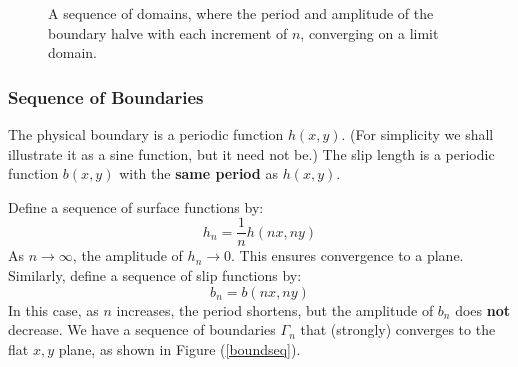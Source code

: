 \documentclass[12pt, a4paper, twoside, openright]{book}
\newcommand{\beff}{\ensuremath{b_{\mathrm{eff}}}}
\begin{document}
\clearpage
\begin{figure}[ht]
\centering
{}
\caption{A sequence of domains, where the period and amplitude of the boundary halve with each increment of $n$, converging on a limit domain.}\label{domainseq}
\end{figure}



\subsubsection{Sequence of Boundaries}

The physical boundary is a periodic function $h(x,y)$.  (For simplicity we shall illustrate it as a sine function, but it need not be.)  
The slip length is a periodic function $b(x,y)$ with the \textbf{same period} as $h(x,y)$.

\vspace{1em}
Define a sequence of surface functions by:
\begin{equation}
h_n = \frac{1}{n} h(nx, ny)
\end{equation}
As $n \to \infty$, the amplitude of $h_n \to 0$.  This ensures convergence to a plane.
Similarly, define a sequence of slip functions by:
\begin{equation}
b_n = b(nx,ny)
\end{equation}
In this case, as $n$ increases, the period shortens, but the amplitude of $b_n$ does \textbf{not} decrease.
We have a sequence of boundaries $\Gamma_n$ that (strongly) converges to the flat $x,y$ plane, as shown in Figure (\ref{boundseq}).
\end{document}

